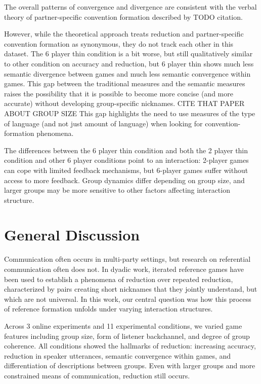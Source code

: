 \documentclass[
  english,
  a4paper,
]{article}
\begin{document}
The overall patterns of convergence and divergence are consistent with the verbal theory of partner-specific convention formation described by TODO citation.

However, while the theoretical approach treats reduction and partner-specific convention formation as synonymous, they do not track each other in this dataset. The 6 player thin condition is a bit worse, but still qualitatively similar to other condition on accuracy and reduction, but 6 player thin shows much less semantic divergence between games and much less semantic convergence within games. This gap between the traditional measures and the semantic measures raises the possibility that it is possible to become more concise (and more accurate) without developing group-specific nicknames. CITE THAT PAPER ABOUT GROUP SIZE This gap highlights the need to use measures of the type of language (and not just amount of language) when looking for convention-formation phenomena.

The differences between the 6 player thin condition and both the 2 player thin condition and other 6 player conditions point to an interaction: 2-player games can cope with limited feedback mechanisms, but 6-player games suffer without access to more feedback. Group dynamics differ depending on group size, and larger groups may be more sensitive to other factors affecting interaction structure.

\hypertarget{general-discussion}{%
\section{General Discussion}\label{general-discussion}}

Communication often occurs in multi-party settings, but research on referential communication often does not. In dyadic work, iterated reference games have been used to establish a phenomena of reduction over repeated reduction, characterized by pairs creating short nicknames that they jointly understand, but which are not universal. In this work, our central question was how this process of reference formation unfolds under varying interaction structures.

Across 3 online experiments and 11 experimental conditions, we varied game features including group size, form of listener backchannel, and degree of group coherence. All conditions showed the hallmarks of reduction: increasing accuracy, reduction in speaker utterances, semantic convergence within games, and differentiation of descriptions between groups. Even with larger groups and more constrained means of communication, reduction still occurs.
\end{document}
